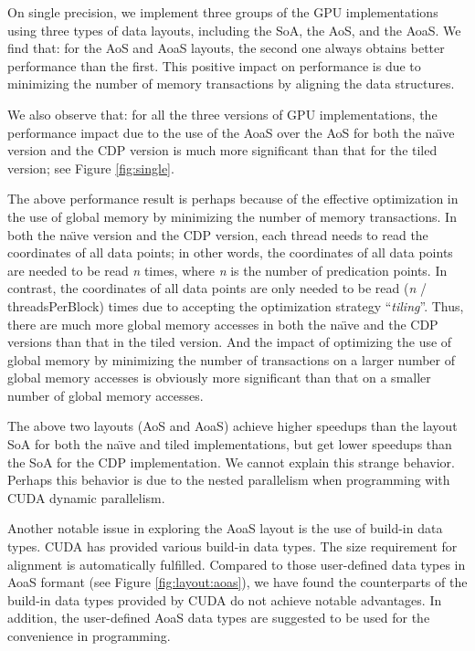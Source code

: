 On single precision, we implement three groups of the GPU implementations using three 
types of data layouts, including the SoA, the AoS, and the AoaS. We find that: 
for the AoS and AoaS layouts, the second one always obtains better 
performance than the first. This positive impact on performance is due to 
minimizing the number of memory transactions by aligning the data 
structures. 

We also observe that: for all the three versions of GPU implementations, the 
performance impact due to the use of the AoaS over the AoS for both the 
na\"{\i}ve version and the CDP version is much more significant than that 
for the tiled version; see Figure \ref{fig:single}.

The above performance result is perhaps because of the effective 
optimization in the use of global memory by minimizing the number of memory 
transactions. In both the na\"{\i}ve version and the CDP version, each 
thread needs to read the coordinates of all data points; in other words, the 
coordinates of all data points are needed to be read \textit{n} times, where \textit{n} is the 
number of predication points. In contrast, the coordinates of all data 
points are only needed to be read (\textit{n} / threadsPerBlock) times due to 
accepting the optimization strategy ``\textit{tiling}''. Thus, there are much 
more global memory accesses in both the na\"{\i}ve and the CDP versions than 
that in the tiled version. And the impact of optimizing the use of global 
memory by minimizing the number of transactions on a larger number of global 
memory accesses is obviously more significant than that on a smaller number 
of global memory accesses. 

The above two layouts (AoS and AoaS) achieve higher speedups than the layout 
SoA for both the na\"{\i}ve and tiled implementations, but get lower 
speedups than the SoA for the CDP implementation. We cannot explain this 
strange behavior. Perhaps this behavior is due to the nested parallelism 
when programming with CUDA dynamic parallelism.

Another notable issue in exploring the AoaS layout is the use of build-in data types. CUDA has provided various build-in data types. The size requirement for alignment is automatically fulfilled. 
Compared to those user-defined data types in AoaS formant (see Figure \ref{fig:layout:aoas}), we have found the counterparts of the build-in data types provided by CUDA do not achieve notable advantages. In addition, the user-defined AoaS data types are suggested to be used for the convenience in programming. 


